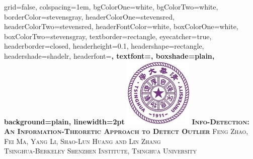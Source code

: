 \documentclass[portrait,final,a1paper,fontscale=0.3]{baposter}
\begin{document}

\begin{poster}%
  {
  grid=false,
  colspacing=1em,
  bgColorOne=white,
  bgColorTwo=white,
  borderColor=stevensgray,
  headerColorOne=stevensred,
  headerColorTwo=stevensred,
  headerFontColor=white,
  boxColorOne=white,
  boxColorTwo=stevensgray,
  textborder=rectangle,
  eyecatcher=true,
  headerborder=closed,
  headerheight=0.1\textheight,
  headershape=rectangle,
  headershade=shadelr,
  headerfont=\Large\bf\textsc, %
  textfont={\setlength{\parindent}{1.5em}},
  boxshade=plain,
  background=plain,
  linewidth=2pt
  }
  {
  		\includegraphics[height=9.0em]{thu.jpg}
  } %
  {\bf \textsc{ Info-Detection: An Information-Theoretic Approach to Detect Outlier } }
  {\textsc{  Feng Zhao, Fei Ma, Yang Li, Shao-Lun Huang and Lin Zhang \\ Tsinghua-Berkeley Shenzhen Institute, Tsinghua University}}
  {%
  }

    \newcommand{\colouredcircle}{%
      \tikz{\useasboundingbox (-0.2em,-0.32em) rectangle(0.2em,0.32em); \draw[draw=black,fill=lightblue,line width=0.03em] (0,0) circle(0.18em);}}


\end{poster}
\end{document}

